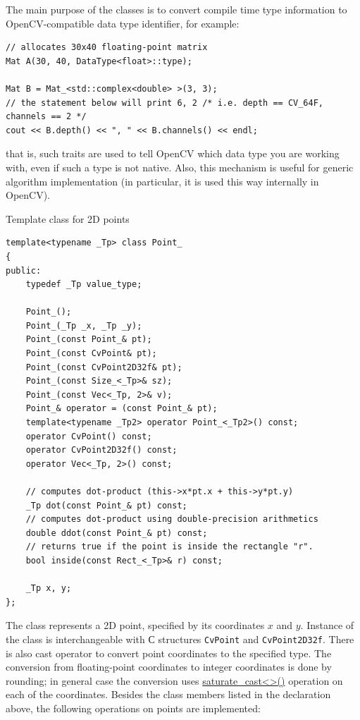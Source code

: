 The main purpose of the classes is to convert compile time type information to OpenCV-compatible data type identifier, for example:

\begin{lstlisting}
// allocates 30x40 floating-point matrix
Mat A(30, 40, DataType<float>::type);

Mat B = Mat_<std::complex<double> >(3, 3);
// the statement below will print 6, 2 /* i.e. depth == CV_64F, channels == 2 */ 
cout << B.depth() << ", " << B.channels() << endl; 
\end{lstlisting}

that is, such traits are used to tell OpenCV which data type you are working with, even if such a type is not native. Also, this mechanism is useful for generic algorithm implementation (in particular, it is used this way internally in OpenCV).

Template class for 2D points

\begin{lstlisting}
template<typename _Tp> class Point_
{
public:
    typedef _Tp value_type;
    
    Point_();
    Point_(_Tp _x, _Tp _y);
    Point_(const Point_& pt);
    Point_(const CvPoint& pt);
    Point_(const CvPoint2D32f& pt);
    Point_(const Size_<_Tp>& sz);
    Point_(const Vec<_Tp, 2>& v);
    Point_& operator = (const Point_& pt);
    template<typename _Tp2> operator Point_<_Tp2>() const;
    operator CvPoint() const;
    operator CvPoint2D32f() const;
    operator Vec<_Tp, 2>() const;

    // computes dot-product (this->x*pt.x + this->y*pt.y)
    _Tp dot(const Point_& pt) const;
    // computes dot-product using double-precision arithmetics
    double ddot(const Point_& pt) const;
    // returns true if the point is inside the rectangle "r".
    bool inside(const Rect_<_Tp>& r) const;
    
    _Tp x, y;
};
\end{lstlisting}

The class represents a 2D point, specified by its coordinates $x$ and $y$.
Instance of the class is interchangeable with С structures \texttt{CvPoint} and \texttt{CvPoint2D32f}. There is also cast operator to convert point coordinates to the specified type. The conversion from floating-point coordinates to integer coordinates is done by rounding; in general case the conversion uses \href{saturate}{saturate\_cast<>()} operation on each of the coordinates. Besides the class members listed in the declaration above, the following operations on points are implemented:

